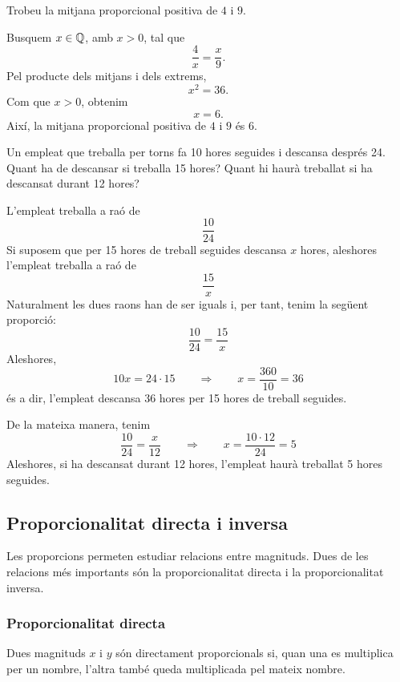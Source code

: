 \begin{exemple}
Trobeu la mitjana proporcional positiva de \(4\) i \(9\).
\end{exemple}

\begin{solucio}
Busquem \(x\in\mathbb{Q}\), amb \(x>0\), tal que
\[
	\frac{4}{x}=\frac{x}{9}.
\]
Pel producte dels mitjans i dels extrems,
\[
	x^2=36.
\]
Com que \(x>0\), obtenim
\[
	x=6.
\]
Així, la mitjana proporcional positiva de \(4\) i \(9\) és \(6\).
\end{solucio}

\begin{exemple}
Un empleat que treballa per torns fa 10 hores seguides i descansa
després 24. Quant ha de descansar si treballa 15
hores? Quant hi haurà treballat si ha descansat
durant 12 hores?
\end{exemple}

\begin{solucio}
L'empleat treballa a raó de%
\[
\frac{10}{24}%
\]
Si suposem que per 15 hores de treball seguides descansa $x$ hores, aleshores
l'empleat treballa a raó de%
\[
\frac{15}{x}%
\]
Naturalment les dues raons han de ser iguals i, per tant, tenim la
següent proporció:%
\[
\frac{10}{24}=\frac{15}{x}%
\]
Aleshores,%
\[
10x=24\cdot15\qquad\Longrightarrow\qquad x=\frac{360}{10}=36
\]
és a dir, l'empleat descansa 36 hores per 15 hores de treball seguides.

De la mateixa manera, tenim%
\[
\frac{10}{24}=\frac{x}{12}\qquad\Longrightarrow\qquad x=\frac{10\cdot12}{24}=5
\]
Aleshores, si ha descansat durant 12 hores, l'empleat haurà treballat 5
hores seguides.
\end{solucio}

\subsection{Proporcionalitat directa i inversa}

Les proporcions permeten estudiar relacions entre magnituds. Dues de les relacions més importants són la proporcionalitat directa i la proporcionalitat inversa.

\subsubsection{Proporcionalitat directa}

Dues magnituds \(x\) i \(y\) són directament proporcionals si, quan una es multiplica per un nombre, l'altra també queda multiplicada pel mateix nombre.

